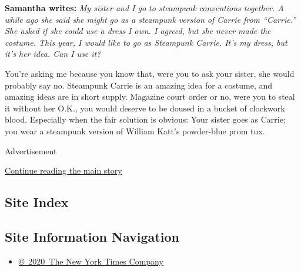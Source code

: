 \textbf{Samantha writes:} \emph{My sister and I go to steampunk
conventions together. A while ago she said she might go as a steampunk
version of Carrie from ``Carrie.'' She asked if she could use a dress I
own. I agreed, but she never made the costume. This year, I would like
to go as Steampunk Carrie. It's my dress, but it's her idea. Can I use
it?}

You're asking me because you know that, were you to ask your sister, she
would probably say no. Steampunk Carrie is an amazing idea for a
costume, and amazing ideas are in short supply. Magazine court order or
no, were you to steal it without her O.K., you would deserve to be
doused in a bucket of clockwork blood. Especially when the fair solution
is obvious: Your sister goes as Carrie; you wear a steampunk version of
William Katt's powder-blue prom tux.

Advertisement

\protect\hyperlink{after-bottom}{Continue reading the main story}

\hypertarget{site-index}{%
\subsection{Site Index}\label{site-index}}

\hypertarget{site-information-navigation}{%
\subsection{Site Information
Navigation}\label{site-information-navigation}}

\begin{itemize}
\tightlist
\item
  \href{https://help.nytimes3xbfgragh.onion/hc/en-us/articles/115014792127-Copyright-notice}{©~2020~The
  New York Times Company}
\end{itemize}

